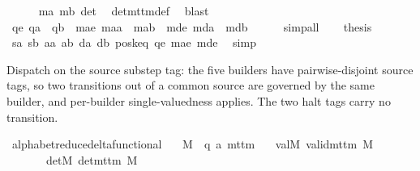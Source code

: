 \begin{isabellebody}
\ \ \ \ \isamarkupfalse%
\ ma\ mb{\isacharprime}{\kern0pt}\ det\ \isamarkupfalse%
\ det{\isacharunderscore}{\kern0pt}mttm{\isacharunderscore}{\kern0pt}def\ \isamarkupfalse%
\ blast\isanewline
\ \ \isamarkupfalse%
\ qe{\isacharcolon}{\kern0pt}\ {\isachardoublequoteopen}qa{\isacharprime}{\kern0pt}\ {\isacharequal}{\kern0pt}\ qb{\isacharprime}{\kern0pt}{\isachardoublequoteclose}\ \ mae{\isacharcolon}{\kern0pt}\ {\isachardoublequoteopen}m{\isacharunderscore}{\kern0pt}aa{\isacharprime}{\kern0pt}\ {\isacharequal}{\kern0pt}\ m{\isacharunderscore}{\kern0pt}ab{\isacharprime}{\kern0pt}{\isachardoublequoteclose}\ \ mde{\isacharcolon}{\kern0pt}\ {\isachardoublequoteopen}m{\isacharunderscore}{\kern0pt}da\ {\isacharequal}{\kern0pt}\ m{\isacharunderscore}{\kern0pt}db{\isachardoublequoteclose}\isanewline
\ \ \ \ \isamarkupfalse%
\ simp{\isacharunderscore}{\kern0pt}all\isanewline
\ \ \isamarkupfalse%
\ {\isacharquery}{\kern0pt}thesis\isanewline
\ \ \ \ \isamarkupfalse%
\ s{}a\ s{}b\ a{}a\ a{}b\ d{}a\ d{}b\ poskeq\ qe\ mae\ mde\ \isamarkupfalse%
\ simp\isanewline
{}\isamarkupfalse%
%
\endisatagproof
{\isafoldproof}%
%
\isadelimproof
%
\endisadelimproof
%
\begin{isamarkuptext}%
Dispatch on the source substep tag: the five builders have
  pairwise-disjoint source tags, so two transitions out of a common
  source  are governed by the same builder, and per-builder
  single-valuedness applies.  The two halt tags carry no transition.%
\end{isamarkuptext}\isamarkuptrue%
\isamarkupfalse%
\ alphabet{\isacharunderscore}{\kern0pt}reduce{\isacharunderscore}{\kern0pt}delta{\isacharunderscore}{\kern0pt}functional{\isacharcolon}{\kern0pt}\isanewline
\ \ \ M\ {\isacharcolon}{\kern0pt}{\isacharcolon}{\kern0pt}\ {\isachardoublequoteopen}{\isacharparenleft}{\kern0pt}{\isacharprime}{\kern0pt}q{\isacharcomma}{\kern0pt}\ {\isacharprime}{\kern0pt}a{\isacharparenright}{\kern0pt}\ mttm{\isachardoublequoteclose}\isanewline
\ \ \ valM{\isacharcolon}{\kern0pt}\ {\isachardoublequoteopen}valid{\isacharunderscore}{\kern0pt}mttm\ M{\isachardoublequoteclose}\isanewline
\ \ \ \ \ \ \ detM{\isacharcolon}{\kern0pt}\ {\isachardoublequoteopen}det{\isacharunderscore}{\kern0pt}mttm\ M{\isachardoublequoteclose}\isanewline

\end{isabellebody}
